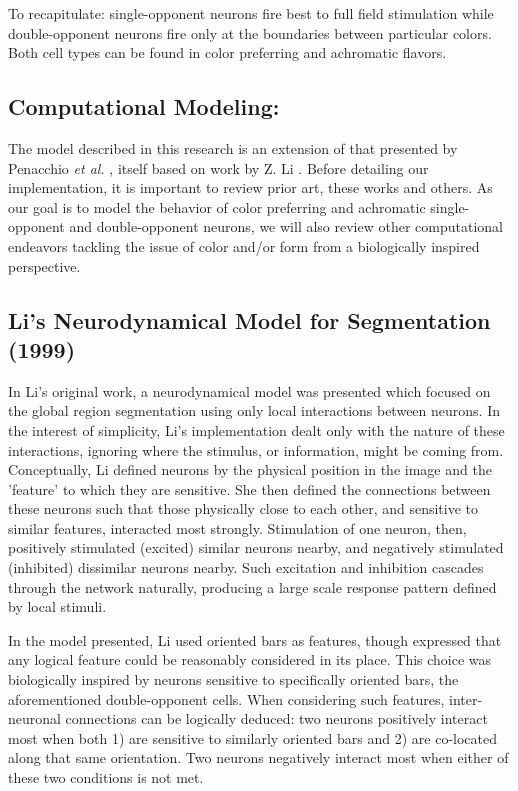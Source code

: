 \documentclass[journal,onecolumn]{IEEEtran}
\begin{document}
To recapitulate: single-opponent neurons fire best to full field stimulation while double-opponent neurons fire only at the boundaries between particular colors. Both cell types can be found in color preferring and achromatic flavors.

\subsection{Computational Modeling:}

The model described in this research is an extension of that presented by Penacchio \textit{et al.} \cite{otazu:plosive}, itself based on work by Z. Li \cite{li:1998, li:1999}. Before detailing our implementation, it is important to review prior art, these works and others. As our goal is to model the behavior of color preferring and achromatic single-opponent and double-opponent neurons, we will also review other computational endeavors tackling the issue of color and/or form from a biologically inspired perspective.


\subsection*{Li's Neurodynamical Model for Segmentation (1999)}
In Li's original work, a neurodynamical model was presented which focused on the global region segmentation using only local interactions between neurons. In the interest of simplicity, Li's implementation dealt only with the nature of these interactions, ignoring where the stimulus, or information, might be coming from. Conceptually, Li defined neurons by the physical position in the image and the 'feature' to which they are sensitive. She then defined the connections between these neurons such that those physically close to each other, and sensitive to similar features, interacted most strongly. Stimulation of one neuron, then, positively stimulated (excited) similar neurons nearby, and negatively stimulated (inhibited) dissimilar neurons nearby. Such excitation and inhibition cascades through the network naturally, producing a large scale response pattern defined by local stimuli.

In the model presented, Li used oriented bars as features, though expressed that any logical feature could be reasonably considered in its place. This choice was biologically inspired by neurons sensitive to specifically oriented bars, the aforementioned double-opponent cells. When considering such features, inter-neuronal connections can be logically deduced: two neurons positively interact most when both 1) are sensitive to similarly oriented bars and 2) are co-located along that same orientation. Two neurons negatively interact most when either of these two conditions is not met.
\end{document}
